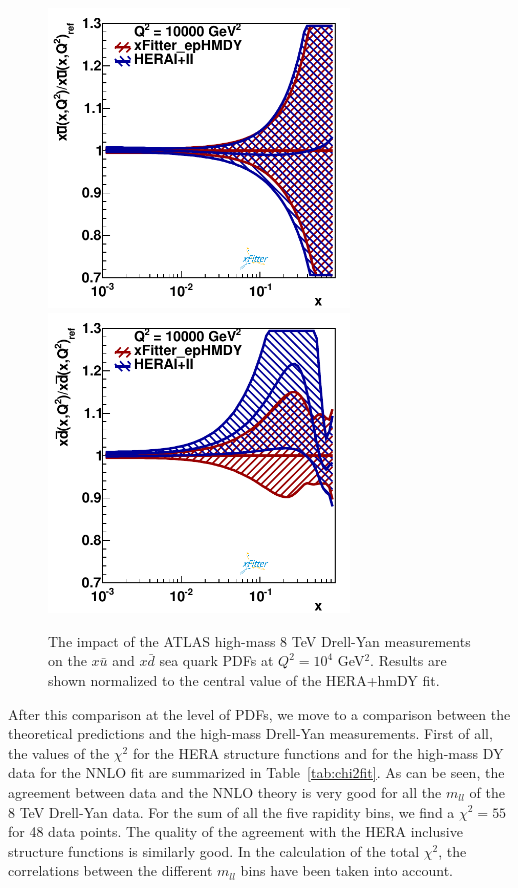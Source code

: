 \begin{figure}[t]
\centering
\includegraphics[width=8cm]{figs/q2_10000_pdf_ubar_ratio}
\includegraphics[width=8cm]{figs/q2_10000_pdf_dbar_ratio} 
\caption{The impact of the ATLAS high-mass 8 TeV Drell-Yan measurements
  on the $x\bar{u}$ and $x\bar{d}$ sea quark PDFs at $Q^2=10^4$ GeV$^2$.
  Results are shown normalized to the central value of the HERA+hmDY fit.
}
\label{fig:QCDfit}
\end{figure}

After this comparison at the level of PDFs, we move to a comparison between the theoretical
predictions and the high-mass Drell-Yan measurements.
%
First of all, the values of the $\chi^2$ for the HERA structure functions
and for the high-mass DY data for the NNLO fit
are summarized in Table~\ref{tab:chi2fit}.
%
As can be seen, the agreement between data and the NNLO theory
is very good for all the $m_{ll}$ of the 8 TeV Drell-Yan data.
%
For the sum of all the five rapidity bins, we find a $\chi^2=55$
for 48 data points.
%
The quality of the agreement with the HERA inclusive structure functions
is similarly good.
%
In the calculation of the total $\chi^2$, the correlations between the different
$m_{ll}$ bins have been taken into account.

